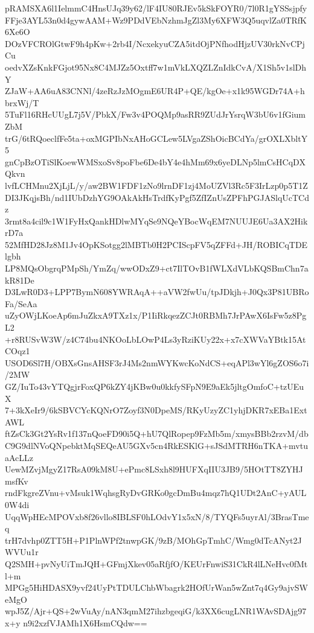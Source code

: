 pRAMSXA6l1IelmmC4HnsUJq39y62/lF4IU80RJEv5kSkFOYR0/7l0R1gYSSsjpfy
FFje3AYL53n0d4gywAAM+Wz9PDdVEbNzhmJgZl3My6XFW3Q5uqvlZa0TRfK6Xe6O
DOzVFCROlGtwF9h4pKw+2rb4I/NcxekyuCZA5itdOjPNfhodHjzUV30rkNvCPjCu
oedvXZsKnkFGjot95Nx8C4MJZz5Oxtff7w1mVkLXQZLZnIdkCvA/X1Sh5v1slDhY
ZJaW+AA6uA83CNNl/4zeRzJzMOgmE6UR4P+QE/kgOe+x1k95WGDr74A+hbrxWj/T
5TuFl16RHcUUgL7j5V/PbkX/Fw3v4POQMp9asRR9ZUdJrYsrqW3bU6v1fGiumZbM
trG/6tRQoeclfFe5ta+oxMGPIbNxAHoGCLew5LVgaZShOicBCdYa/grOXLXbltY5
gnCpBzOTiSlKoewWMSxoSv8poFbe6De4bY4e4hMm69x6yeDLNp5lmCsHCqDXQkvn
lvfLCHMnu2XjLjL/y/aw2BW1FDF1zNo9lrnDF1zj4MoUZVl3Rc5F3IrLzp0p5T1Z
DI3JKqjsBh/nd1IUbDzhYG9OAkAkHsTrdfKyPgf5ZfIZnUsZPFhPGJASlqUcTCdz
3rmt8a4cil9c1W1FyHxQankHDlwMYqSe9NQeYBocWqEM7NUUJE6Ua3AX2HikrD7a
52MfHD28Jz8M1Jv4OpKSotgg2lMBTb0H2PCIScpFV5qZFFd+JH/ROBICqTDElgbh
LP8MQsObgrqPMpSh/YmZq/wwODxZ9+ct7IlTOvB1fWLXdVLbKQSBmChn7akR81De
D3LwR0D3+LPP7BymN608YWRAqA++aVW2fwUu/tpJDkjh+J0Qx3P81UBRoFa/SeAa
uZyOWjLKoeAp6mJuZkxA9TXz1x/P1IiRkqezZCJt0RBMh7JrPAwX6IsFw5z8PgL2
+r8RUSvW3W/z4C74bu4NKOoLbLOwP4Ls3yRziKUy22x+x7cXWVaYBtk15AtCOqz1
USOD6Sl7H/OBXsGnsAHSF3rJ4Ms2nmWYKwcKoNdCS+eqAPl3wYl6gZOS6o7i/2MW
GZ/IuTo43vYTQgjrFoxQP6kZY4jKBw0u0kkfySFpN9E9aEk5jltgOmfoC+tzUEuX
7+3kXeIr9/6kSBVCYcKQNrO7Zoyf3N0DpeMS/RKyUzyZC1yhjDKR7xEBa1ExtAWL
ftZsCk3Gt2YsRv1f137nQoeFD90i5Q+hU7QlRopep9FzMb5m/xmysBBb2rzvM/db
C9G9dlNVoQNpebktMqSEQeAU5GXv5cn4RkESKlG+sJSdMTRH6nTKA+mvtuaAcLLz
UewMZvjMgyZ17RsA09kM8U+ePmc8LSxh8l9HUFXqIIU3JB9/5HOtTT8ZYHJmsfKv
rndFkgreZVnu+vMsuk1WqhsgRyDvGRKo0gcDmBu4mqz7hQ1UDt2AnC+yAUL0W4di
UqqWpHEcMPOVxb8f26vllo8IBLSF0hLOdvY1x5xN/8/TYQFs5uyrAl/3BrasTmeq
trH7dvhp0ZTT5H+P1PlnWPf2tnwpGK/9zB/MOhGpTmhC/Wmg0dTcANyt2JWVUu1r
Q2SMH+pvNyUiTmJQH+GFmjXkev05aRfjfO/KEUrFnwiS31CkR4lLNeHvc0fMtl+m
MPGg5HiHDASX9yvf24UyPtTDULChbWbagrk2HOfUrWan5wZnt7q4Gy9ajvSWeMgO
wpJ5Z/Ajr+QS+2wVuAy/nAN3qmM27ihzbgeqiG/k3XX6cugLNR1WAvSDAjg97x+y
n9i2xzfVJAMh1X6HsmCQdw==
